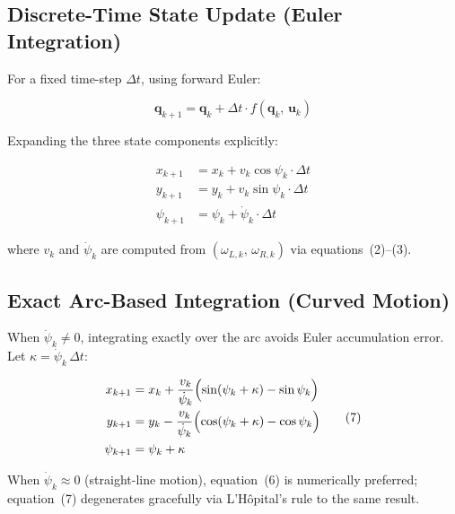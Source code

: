 \documentclass[12pt,a4paper]{article}
\newcommand{\q}{\mathbf{q}}
\newcommand{\bu}{\mathbf{u}}
\begin{document}
\subsection{Discrete-Time State Update (Euler Integration)}

For a fixed time-step $\Delta t$, using forward Euler:

\begin{equation}
  \q_{k+1} = \q_k + \Delta t \cdot f(\q_k,\,\bu_k)
  \tag{5}
\end{equation}

Expanding the three state components explicitly:

\begin{equation}
  \begin{aligned}
    x_{k+1}   &= x_k   + v_k \cos\psi_k \cdot \Delta t \\
    y_{k+1}   &= y_k   + v_k \sin\psi_k \cdot \Delta t \\
    \psi_{k+1} &= \psi_k + \dot{\psi}_k  \cdot \Delta t
  \end{aligned}
  \tag{6}
\end{equation}

where $v_k$ and $\dot\psi_k$ are computed from $(\omega_{L,k},\,\omega_{R,k})$
via equations~(2)--(3).

\subsection{Exact Arc-Based Integration (Curved Motion)}

When $\dot\psi_k \neq 0$, integrating exactly over the arc avoids Euler
accumulation error. Let $\kappa = \dot\psi_k\,\Delta t$:

\begin{equation}
  \begin{aligned}
    x_{k+1}   &= x_k + \frac{v_k}{\dot{\psi}_k}
                  \Bigl(\sin(\psi_k+\kappa) - \sin\psi_k\Bigr) \\
    y_{k+1}   &= y_k - \frac{v_k}{\dot{\psi}_k}
                  \Bigl(\cos(\psi_k+\kappa) - \cos\psi_k\Bigr) \\
    \psi_{k+1} &= \psi_k + \kappa
  \end{aligned}
  \tag{7}
\end{equation}

When $\dot\psi_k \approx 0$ (straight-line motion), equation~(6) is
numerically preferred; equation~(7) degenerates gracefully via
L'H\^{o}pital's rule to the same result.
\end{document}
